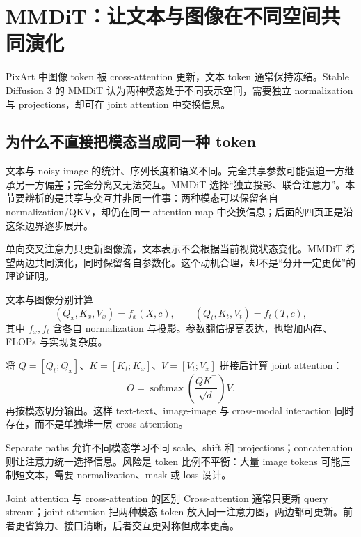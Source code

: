 \section{MMDiT：让文本与图像在不同空间共同演化}

PixArt 中图像 token 被 cross-attention 更新，文本 token 通常保持冻结。Stable Diffusion 3 的 MMDiT 认为两种模态处于不同表示空间，需要独立 normalization 与 projections，却可在 joint attention 中交换信息。

\subsection{为什么不直接把模态当成同一种 token}

文本与 noisy image 的统计、序列长度和语义不同。完全共享参数可能强迫一方继承另一方偏差；完全分离又无法交互。MMDiT 选择“独立投影、联合注意力”。本节要辨析的是共享与交互并非同一件事：两种模态可以保留各自 normalization/QKV，却仍在同一 attention map 中交换信息；后面的四页正是沿这条边界逐步展开。


单向交叉注意力只更新图像流，文本表示不会根据当前视觉状态变化。MMDiT 希望两边共同演化，同时保留各自参数化。这个动机合理，却不是“分开一定更优”的理论证明。


文本与图像分别计算
\[
(Q_x,K_x,V_x)=f_x(X,c),\qquad
(Q_t,K_t,V_t)=f_t(T,c),
\]
其中 $f_x,f_t$ 含各自 normalization 与投影。参数翻倍提高表达，也增加内存、FLOPs 与实现复杂度。


将 $Q=[Q_t;Q_x]$、$K=[K_t;K_x]$、$V=[V_t;V_x]$ 拼接后计算 joint attention：
\[
O=\operatorname{softmax}\!\left(\frac{QK^\top}{\sqrt d}\right)V.
\]
再按模态切分输出。这样 text-text、image-image 与 cross-modal interaction 同时存在，而不是单独堆一层 cross-attention。


Separate paths 允许不同模态学习不同 scale、shift 和 projections；concatenation 则让注意力统一选择信息。风险是 token 比例不平衡：大量 image tokens 可能压制短文本，需要 normalization、mask 或 loss 设计。

\begin{knowledgebox}{Joint attention 与 cross-attention 的区别}
Cross-attention 通常只更新 query stream；joint attention 把两种模态 token 放入同一注意力图，两边都可更新。前者更省算力、接口清晰，后者交互更对称但成本更高。
\end{knowledgebox}

